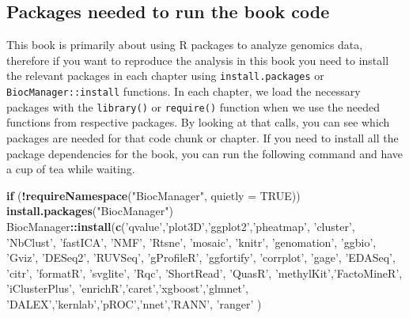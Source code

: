 \documentclass[12pt,]{krantz}
\newenvironment{Shaded}{\begin{snugshade}}{\end{snugshade}}
\newcommand{\ControlFlowTok}[1]{\textcolor[rgb]{0.13,0.29,0.53}{\textbf{#1}}}
\newcommand{\DataTypeTok}[1]{\textcolor[rgb]{0.13,0.29,0.53}{#1}}
\newcommand{\KeywordTok}[1]{\textcolor[rgb]{0.13,0.29,0.53}{\textbf{#1}}}
\newcommand{\NormalTok}[1]{#1}
\newcommand{\OperatorTok}[1]{\textcolor[rgb]{0.81,0.36,0.00}{\textbf{#1}}}
\newcommand{\OtherTok}[1]{\textcolor[rgb]{0.56,0.35,0.01}{#1}}
\newcommand{\StringTok}[1]{\textcolor[rgb]{0.31,0.60,0.02}{#1}}
\begin{document}
\hypertarget{packages-needed-to-run-the-book-code}{%
\subsection*{Packages needed to run the book code}\label{packages-needed-to-run-the-book-code}}


This book is primarily about using R packages to analyze genomics data, therefore if you want to reproduce the analysis in this book you need to install the relevant packages in each chapter using \texttt{install.packages} or \texttt{BiocManager::install} functions. In each chapter, we load the necessary packages with the \texttt{library()} or \texttt{require()} function when we use the needed functions from respective packages. By looking at that calls, you can see which packages are needed for that code chunk or chapter. If you need to install all the package dependencies for the book, you can run the following command and have a cup of tea while waiting.

\begin{Shaded}
\begin{Highlighting}[]
\ControlFlowTok{if}\NormalTok{ (}\OperatorTok{!}\KeywordTok{requireNamespace}\NormalTok{(}\StringTok{"BiocManager"}\NormalTok{, }\DataTypeTok{quietly =} \OtherTok{TRUE}\NormalTok{))}
    \KeywordTok{install.packages}\NormalTok{(}\StringTok{"BiocManager"}\NormalTok{)}
\NormalTok{BiocManager}\OperatorTok{::}\KeywordTok{install}\NormalTok{(}\KeywordTok{c}\NormalTok{(}\StringTok{'qvalue'}\NormalTok{,}\StringTok{'plot3D'}\NormalTok{,}\StringTok{'ggplot2'}\NormalTok{,}\StringTok{'pheatmap'}\NormalTok{,}
                      \StringTok{'cluster'}\NormalTok{, }\StringTok{'NbClust'}\NormalTok{, }\StringTok{'fastICA'}\NormalTok{, }\StringTok{'NMF'}\NormalTok{,}
                      \StringTok{'Rtsne'}\NormalTok{, }\StringTok{'mosaic'}\NormalTok{, }\StringTok{'knitr'}\NormalTok{, }\StringTok{'genomation'}\NormalTok{,}
                      \StringTok{'ggbio'}\NormalTok{, }\StringTok{'Gviz'}\NormalTok{, }\StringTok{'DESeq2'}\NormalTok{, }\StringTok{'RUVSeq'}\NormalTok{,}
                      \StringTok{'gProfileR'}\NormalTok{, }\StringTok{'ggfortify'}\NormalTok{, }\StringTok{'corrplot'}\NormalTok{,}
                      \StringTok{'gage'}\NormalTok{, }\StringTok{'EDASeq'}\NormalTok{, }\StringTok{'citr'}\NormalTok{, }\StringTok{'formatR'}\NormalTok{,}
                      \StringTok{'svglite'}\NormalTok{, }\StringTok{'Rqc'}\NormalTok{, }\StringTok{'ShortRead'}\NormalTok{, }\StringTok{'QuasR'}\NormalTok{,}
                      \StringTok{'methylKit'}\NormalTok{,}\StringTok{'FactoMineR'}\NormalTok{, }\StringTok{'iClusterPlus'}\NormalTok{,}
                      \StringTok{'enrichR'}\NormalTok{,}\StringTok{'caret'}\NormalTok{,}\StringTok{'xgboost'}\NormalTok{,}\StringTok{'glmnet'}\NormalTok{,}
                      \StringTok{'DALEX'}\NormalTok{,}\StringTok{'kernlab'}\NormalTok{,}\StringTok{'pROC'}\NormalTok{,}\StringTok{'nnet'}\NormalTok{,}\StringTok{'RANN'}\NormalTok{,}
                      \StringTok{'ranger'}
\NormalTok{                     )}
\end{Highlighting}
\end{Shaded}
\end{document}
